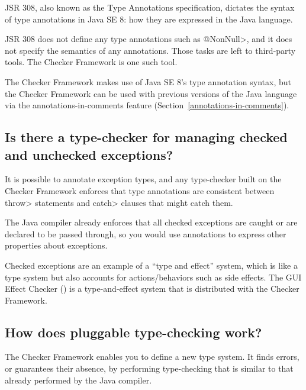 JSR 308, also known as the Type Annotations specification, dictates the
syntax of type annotations in Java SE 8:  how they are expressed in the
Java language.

JSR 308 does not define any type annotations such as \<@NonNull>, and it does
not specify the semantics of any annotations.  Those tasks are left to
third-party tools.  The Checker Framework is one such tool.

The Checker Framework makes use of Java SE 8's type annotation syntax, but
the Checker Framework can
be used with previous versions of the Java language via the
annotations-in-comments feature (Section~\ref{annotations-in-comments}).


\subsection{Is there a type-checker for managing checked and unchecked exceptions?\label{faq-checked-exceptions}}

It is possible to annotate exception types, and any type-checker built on the
Checker Framework enforces that type annotations are consistent between
\<throw> statements and \<catch> clauses that might catch them.

The Java compiler already enforces that all checked exceptions are caught
or are declared to be passed through, so you would use annotations to
express other properties about exceptions.

Checked exceptions are an example of a ``type and effect'' system, which is
like a type system but also accounts for actions/behaviors such as side
effects.  The GUI Effect Checker () is a
type-and-effect system that is distributed with the Checker Framework.


\subsection{How does pluggable type-checking work?\label{faq-pluggable-type-checking}}

The Checker Framework enables you to define a new type system.  It finds
errors, or guarantees their absence, by performing type-checking that is
similar to that already performed by the Java compiler.

